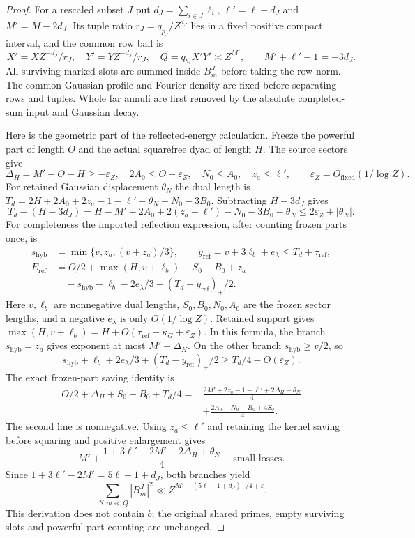 \documentclass[11pt,a4paper]{article}
\theoremstyle{definition}
\newcommand{\N}{\operatorname{N}}
\newcommand{\eps}{\varepsilon}
\begin{document}
\begin{proof}
For a rescaled subset $J$ put
$d_J=\sum_{i\in J}\ell_i$, $\ell'=\ell-d_J$ and $M'=M-2d_J$.
Its tuple ratio $r_J=q_{p_J}/Z^{d_J}$ lies in a fixed positive
compact interval, and the common row ball is
\[
 X'=XZ^{-d_J}/r_J,\quad Y'=YZ^{-d_J}/r_J,\quad
 Q=q_{b_*}X'Y'\asymp Z^{M'},\qquad M'+\ell'-1=-3d_J.
\]
All surviving marked slots are summed inside $B_m^J$ before taking
the row norm. The common Gaussian profile and Fourier density are
fixed before separating rows and tuples.
Whole far annuli are first removed by the absolute completed-sum
input and Gaussian decay.

Here is the geometric part of the reflected-energy calculation.
Freeze the powerful part of length $O$ and the actual squarefree
dyad of length $H$. The source sectors give
\[
 \Delta_H=M'-O-H\ge-\eps_Z,\quad
 2A_0\le O+\eps_Z,\quad N_0\le A_0,\quad z_a\le\ell',
 \qquad \eps_Z=O_{\mathrm{fixed}}(1/\log Z).
\]
For retained Gaussian displacement $\theta_N$ the dual length is
$T_d=2H+2A_0+2z_a-1-\ell'-\theta_N-N_0-3B_0$.
Subtracting $H-3d_J$ gives
\[
 T_d-(H-3d_J)
 =H-M'+2A_0+2(z_a-\ell')-N_0-3B_0-\theta_N
 \le2\eps_Z+|\theta_N|.
\]
For completeness the imported reflection expression, after
counting frozen parts once, is
\[
\begin{split}
 s_{\mathrm{hyb}}&=\min\{v,z_a,(v+z_a)/3\},\qquad
 y_{\mathrm{ref}}=v+3\ell_b+e_\lambda\le T_d+\tau_{\mathrm{ref}},\\
 E_{\mathrm{ref}}&=O/2+\max(H,v+\ell_b)-S_0-B_0+z_a\\
 &\quad-s_{\mathrm{hyb}}-\ell_b-2e_\lambda/3
                  -(T_d-y_{\mathrm{ref}})_+/2.
\end{split}
\]
Here $v,\ell_b$ are nonnegative dual lengths, $S_0,B_0,N_0,A_0$
are the frozen sector lengths, and a negative $e_\lambda$ is
only $O(1/\log Z)$. Retained support gives
$\max(H,v+\ell_b)=H+O(\tau_{\mathrm{ref}}+\kappa_G+\eps_Z)$.
In this formula, the branch
$s_{\mathrm{hyb}}=z_a$ gives exponent at most $M'-\Delta_H$.
On the other branch $s_{\mathrm{hyb}}\ge v/2$, so
\[
 s_{\mathrm{hyb}}+\ell_b+2e_\lambda/3
                    +(T_d-y_{\mathrm{ref}})_+/2
 \ge T_d/4-O(\eps_Z).
\]
The exact frozen-part saving identity is
\[
\begin{split}
 O/2+\Delta_H+S_0+B_0+T_d/4
 ={}&\frac{2M'+2z_a-1-\ell'+2\Delta_H-\theta_N}{4}\\
 &+\frac{2A_0-N_0+B_0+4S_0}{4}.
\end{split}
\]
The second line is nonnegative. Using $z_a\le\ell'$ and retaining
the kernel saving before squaring and positive enlargement gives
\[
 M'+\frac{1+3\ell'-2M'-2\Delta_H+\theta_N}{4}
 +\text{small losses}.
\]
Since $1+3\ell'-2M'=5\ell-1+d_J$, both branches yield
\begin{equation}\label{eq:row}
 \sum_{\N m\ll Q}|B_m^J|^2
 \ll Z^{M'+(5\ell-1+d_J)_+/4+\eps}.
\end{equation}
This derivation does not contain $b$; the original shared primes,
empty surviving slots and powerful-part counting are unchanged.


\end{proof}
\end{document}
